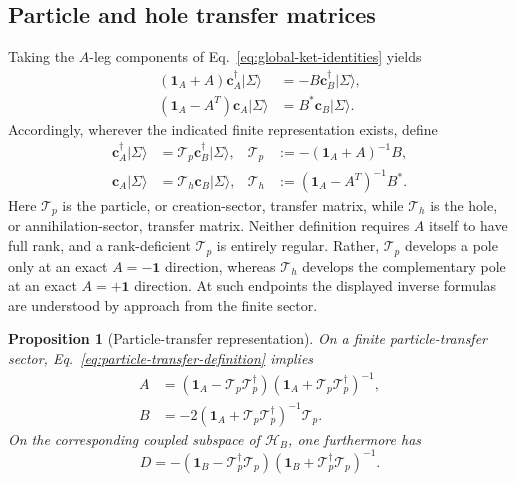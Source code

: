 \documentclass[aps,prb,onecolumn,nofootinbib,superscriptaddress]{revtex4-2}
\newcommand{\I}{\mathbf{1}}
\newcommand{\ket}[1]{\lvert #1\rangle}
\newcommand{\cH}{\mathcal{H}}
\theoremstyle{plain}
\newtheorem{proposition}{Proposition}
\theoremstyle{definition}
\begin{document}
\subsection{Particle and hole transfer matrices}

Taking the \(A\)-leg components of Eq.~\eqref{eq:global-ket-identities}
yields
\begin{align}
  (\I_A+A)\bm c_A^\dagger\ket{\Sigma}
  &=-B\bm c_B^\dagger\ket{\Sigma},
  \label{eq:creation-leg-equation}\\
  (\I_A-A^T)\bm c_A\ket{\Sigma}
  &=B^*\bm c_B\ket{\Sigma}.
  \label{eq:annihilation-leg-equation}
\end{align}
Accordingly, wherever the indicated finite representation exists, define
\begin{align}
  \bm c_A^\dagger\ket{\Sigma}
  &=
  \mathcal T_p\bm c_B^\dagger\ket{\Sigma},
  &
  \mathcal T_p
  &:=
  -(\I_A+A)^{-1}B,
  \label{eq:particle-transfer-definition}\\
  \bm c_A\ket{\Sigma}
  &=
  \mathcal T_h\bm c_B\ket{\Sigma},
  &
  \mathcal T_h
  &:=
  (\I_A-A^T)^{-1}B^* .
  \label{eq:hole-transfer-definition}
\end{align}
Here \(\mathcal T_p\) is the particle, or creation-sector, transfer matrix,
while \(\mathcal T_h\) is the hole, or annihilation-sector, transfer matrix.
Neither definition requires \(A\) itself to have full rank, and a
rank-deficient \(\mathcal T_p\) is entirely regular.  Rather,
\(\mathcal T_p\) develops a pole only at an exact \(A=-\I\) direction,
whereas \(\mathcal T_h\) develops the complementary pole at an exact
\(A=+\I\) direction.  At such endpoints the displayed inverse formulas are
understood by approach from the finite sector.

\begin{proposition}[Particle-transfer representation]
\label{prop:particle-covariance}
On a finite particle-transfer sector, Eq.~\eqref{eq:particle-transfer-definition}
implies
\begin{align}
  A
  &=
  (\I_A-\mathcal T_p\mathcal T_p^\dagger)
  (\I_A+\mathcal T_p\mathcal T_p^\dagger)^{-1},
  \label{eq:particle-A-reconstruction}\\
  B
  &=
  -2(\I_A+\mathcal T_p\mathcal T_p^\dagger)^{-1}\mathcal T_p.
  \label{eq:particle-B-reconstruction}
\end{align}
On the corresponding coupled subspace of \(\cH_B\), one furthermore has
\begin{equation}
  D
  =
  -(\I_B-\mathcal T_p^\dagger\mathcal T_p)
  (\I_B+\mathcal T_p^\dagger\mathcal T_p)^{-1}.
  \label{eq:particle-D-reconstruction}
\end{equation}
\end{proposition}
\end{document}
